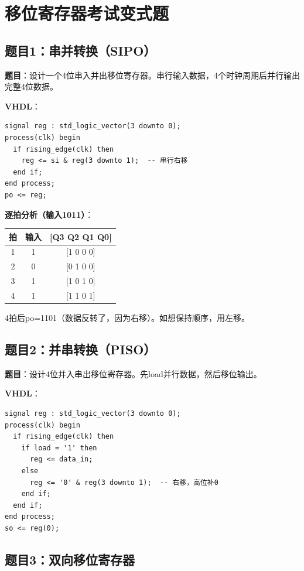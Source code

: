 \chapter{移位寄存器考试变式题}

\section*{题目1：串并转换（SIPO）}

\textbf{题目}：设计一个4位串入并出移位寄存器。串行输入数据，4个时钟周期后并行输出完整4位数据。

\textbf{VHDL}：
\begin{lstlisting}
signal reg : std_logic_vector(3 downto 0);
process(clk) begin
  if rising_edge(clk) then
    reg <= si & reg(3 downto 1);  -- 串行右移
  end if;
end process;
po <= reg;
\end{lstlisting}

\textbf{逐拍分析（输入1011）}：
\begin{center}
\begin{tabular}{|c|c|c|}
\hline
拍 & 输入 & [Q3 Q2 Q1 Q0] \\
\hline
1 & 1 & [1 0 0 0] \\
2 & 0 & [0 1 0 0] \\
3 & 1 & [1 0 1 0] \\
4 & 1 & [1 1 0 1] \\
\hline
\end{tabular}
\end{center}

4拍后po=1101（数据反转了，因为右移）。如想保持顺序，用左移。

\section*{题目2：并串转换（PISO）}

\textbf{题目}：设计4位并入串出移位寄存器。先load并行数据，然后移位输出。

\textbf{VHDL}：
\begin{lstlisting}
signal reg : std_logic_vector(3 downto 0);
process(clk) begin
  if rising_edge(clk) then
    if load = '1' then
      reg <= data_in;
    else
      reg <= '0' & reg(3 downto 1);  -- 右移，高位补0
    end if;
  end if;
end process;
so <= reg(0);
\end{lstlisting}

\section*{题目3：双向移位寄存器}

